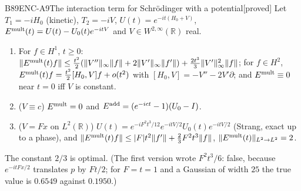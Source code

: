\documentclass[11pt,a4paper,oneside]{report}
\newcommand{\badge}[2]{\textcolor{#1}{\textsf{\footnotesize[#2]}}}
\newcommand{\proved}{\badge{cC}{proved}}
\newcommand{\R}{\mathbb{R}}\newcommand{\C}{\mathbb{C}}\newcommand{\N}{\mathbb{N}}\newcommand{\Z}{\mathbb{Z}}\newcommand{\Q}{\mathbb{Q}}
\newenvironment{dimcard}[5]{\par\Needspace{12\baselineskip}\begin{dimcardbox}{#1}{#2}{#3}{#4}{#5}}{\end{dimcardbox}}
\begin{document}
\begin{dimcard}{B89}{ENC-A9}{The interaction term for Schr\"odinger with a potential}{\proved}{}
Let $T_1=-iH_0$ (kinetic), $T_2=-iV$, $U(t)=e^{-it(H_0+V)}$, $E^{\rm mult}(t)=U(t)-U_0(t)e^{-itV}$ and $V\in W^{2,\infty}(\R)$ real.
\begin{enumerate}[label=(\alph*)]
\item For $f\in H^1$, $t\ge0$: $\|E^{\rm mult}(t)f\|\le\frac{t^2}2(\|V''\|_\infty\|f\|+2\|V'\|_\infty\|f'\|)+\frac{2t^3}3\|V'\|_\infty^2\|f\|$; for $f\in H^2$, $E^{\rm mult}(t)f=\frac{t^2}2[H_0,V]f+o(t^2)$ with $[H_0,V]=-V''-2V'\partial$; and $E^{\rm mult}\equiv0$ near $t=0$ iff $V$ is constant.
\item ($V\equiv c$) $E^{\rm mult}=0$ and $E^{\rm add}=(e^{-ict}-1)(U_0-I)$.
\item ($V=Fx$ on $L^2(\R)$) $U(t)=e^{-iF^2t^3/12}e^{-itV/2}U_0(t)e^{-itV/2}$ (Strang, exact up to a phase), and $\|E^{\rm mult}(t)f\|\le|F|t^2\|f'\|+\frac23F^2t^3\|f\|$, $\|E^{\rm mult}(t)\|_{L^2\to L^2}=2$.
\end{enumerate}
The constant $2/3$ is optimal. (The first version wrote $F^2t^3/6$: false, because $e^{-itFx/2}$ translates $p$ by $Ft/2$; for $F=t=1$ and a Gaussian of width $25$ the true value is $0.6549$ against $0.1950$.)
\end{dimcard}
\end{document}
